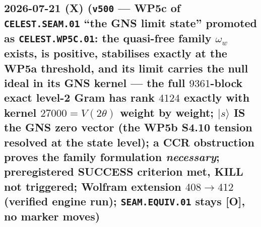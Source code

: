 \documentclass[11pt]{article}
\providecommand{\mO}{\textbf{[O]}}\providecommand{\mX}{\textbf{[X]}}
\begin{document}
\subsection*{2026-07-21 (X) (\texttt{v500} --- WP5c of \texttt{CELEST.SEAM.01} ``the GNS limit state'' promoted as \texttt{CELEST.WP5C.01}: the quasi-free family $\omega_w$ exists, is positive, stabilises exactly at the WP5a threshold, and its limit carries the null ideal in its GNS kernel --- the full $9361$-block exact level-2 Gram has rank $4124$ exactly with kernel $27000=V(2\theta)$ weight by weight; $|s\rangle$ IS the GNS zero vector (the WP5b S4.10 tension resolved at the state level); a CCR obstruction proves the family formulation \emph{necessary}; preregistered SUCCESS criterion met, KILL not triggered; Wolfram extension $408\to412$ (verified engine run); \texttt{SEAM.EQUIV.01} stays \mO, no marker moves)}
\end{document}

